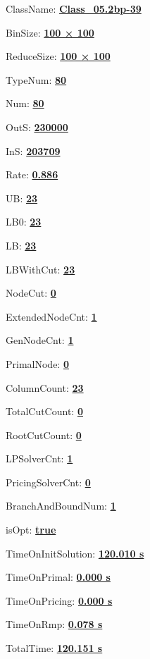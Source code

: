 \documentclass[11pt]{article}
\begin{document}
\pagestyle{empty}


ClassName: \underline{\textbf{Class_05.2bp-39}}
\par
BinSize: \underline{\textbf{100 × 100}}
\par
ReduceSize: \underline{\textbf{100 × 100}}
\par
TypeNum: \underline{\textbf{80}}
\par
Num: \underline{\textbf{80}}
\par
OutS: \underline{\textbf{230000}}
\par
InS: \underline{\textbf{203709}}
\par
Rate: \underline{\textbf{0.886}}
\par
UB: \underline{\textbf{23}}
\par
LB0: \underline{\textbf{23}}
\par
LB: \underline{\textbf{23}}
\par
LBWithCut: \underline{\textbf{23}}
\par
NodeCut: \underline{\textbf{0}}
\par
ExtendedNodeCnt: \underline{\textbf{1}}
\par
GenNodeCnt: \underline{\textbf{1}}
\par
PrimalNode: \underline{\textbf{0}}
\par
ColumnCount: \underline{\textbf{23}}
\par
TotalCutCount: \underline{\textbf{0}}
\par
RootCutCount: \underline{\textbf{0}}
\par
LPSolverCnt: \underline{\textbf{1}}
\par
PricingSolverCnt: \underline{\textbf{0}}
\par
BranchAndBoundNum: \underline{\textbf{1}}
\par
isOpt: \underline{\textbf{true}}
\par
TimeOnInitSolution: \underline{\textbf{120.010 s}}
\par
TimeOnPrimal: \underline{\textbf{0.000 s}}
\par
TimeOnPricing: \underline{\textbf{0.000 s}}
\par
TimeOnRmp: \underline{\textbf{0.078 s}}
\par
TotalTime: \underline{\textbf{120.151 s}}
\par
\newpage


\end{document}
